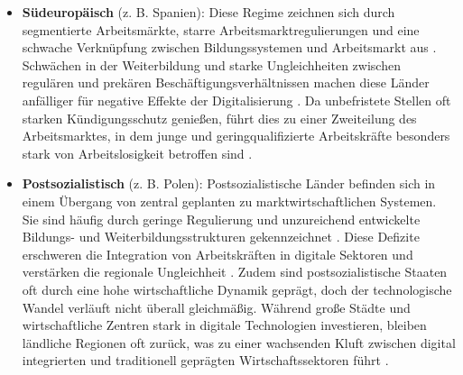 \begin{itemize}

    \item \textbf{Südeuropäisch} (z. B. Spanien): Diese Regime zeichnen sich durch 
    segmentierte Arbeitsmärkte, starre Arbeitsmarktregulierungen und eine schwache 
    Verknüpfung zwischen Bildungssystemen und Arbeitsmarkt aus 
    \parencite[S. 19]{ferrera1996thesouthern}. Schwächen in der Weiterbildung 
    und starke Ungleichheiten zwischen regulären und prekären Beschäftigungsverhältnissen 
    machen diese Länder anfälliger für negative Effekte der Digitalisierung 
    \parencite[S. 19-20]{ferrera1996thesouthern}. Da unbefristete Stellen oft starken 
    Kündigungsschutz genießen, führt dies zu einer Zweiteilung des Arbeitsmarktes, in dem 
    junge und geringqualifizierte Arbeitskräfte besonders stark von Arbeitslosigkeit 
    betroffen sind \parencite[S. 19-21]{ferrera1996thesouthern}.
    
    \item \textbf{Postsozialistisch} (z. B. Polen): Postsozialistische Länder befinden sich 
    in einem Übergang von zentral geplanten zu marktwirtschaftlichen Systemen. Sie sind 
    häufig durch geringe Regulierung und unzureichend entwickelte Bildungs- und 
    Weiterbildungsstrukturen gekennzeichnet \parencite[S. 88–93]{cerami2006socialpolicy}. 
    Diese Defizite erschweren die Integration von Arbeitskräften in digitale Sektoren und 
    verstärken die regionale Ungleichheit \parencite[S. 88–93]{cerami2006socialpolicy}. 
    Zudem sind postsozialistische Staaten oft durch eine hohe wirtschaftliche Dynamik 
    geprägt, doch der technologische Wandel verläuft nicht überall gleichmäßig. Während 
    große Städte und wirtschaftliche Zentren stark in digitale Technologien investieren, 
    bleiben ländliche Regionen oft zurück, was zu einer wachsenden Kluft zwischen digital 
    integrierten und traditionell geprägten Wirtschaftssektoren führt 
    \parencite[S. 90]{cerami2006socialpolicy}.
    
\end{itemize}

